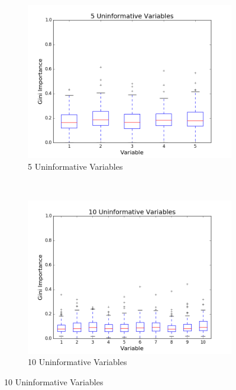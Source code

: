\begin{figure}[H]
  \centering
  \caption{Variable Importance Scores for Different Variable Counts}
  \begin{subfigure}[b]{0.45\textwidth}
    \includegraphics[width=\textwidth]{figures/random_forests/rf_variable_count_bias_5.png}
    \caption{5 Uninformative Variables}
    \label{fig:var-count-5}
  \end{subfigure}
  ~
  \begin{subfigure}[b]{0.45\textwidth}
    \includegraphics[width=\textwidth]{figures/random_forests/rf_variable_count_bias_10.png}
    \caption{10 Uninformative Variables}
    \label{fig:var-count-10}
  \end{subfigure}

\end{figure}
